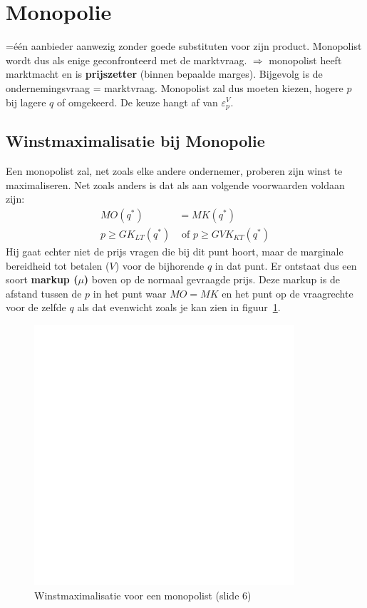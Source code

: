 \section{Monopolie}
=\'e\'en aanbieder aanwezig zonder goede substituten voor zijn product. Monopolist wordt dus als enige geconfronteerd met de marktvraag. $\Rightarrow$ monopolist heeft marktmacht en is \textbf{prijszetter} (binnen bepaalde marges). Bijgevolg is de ondernemingsvraag = marktvraag. Monopolist zal dus moeten kiezen, hogere $p$ bij lagere $q$ of omgekeerd. De keuze hangt af van $\varepsilon^V_p$.

\subsection{Winstmaximalisatie bij Monopolie}
Een monopolist zal, net zoals elke andere ondernemer, proberen zijn winst te maximaliseren. Net zoals anders is dat als aan volgende voorwaarden voldaan zijn:
\begin{align}
   MO(q^*) &= MK(q^*) \\
   p \ge GK_{LT}(q^*) &\text{ of } p \ge GVK_{KT}(q^*)
\end{align}
Hij gaat echter niet de prijs vragen die bij dit punt hoort, maar de marginale bereidheid tot betalen ($V$) voor de bijhorende $q$ in dat punt. Er ontstaat dus een soort \textbf{markup ($\mu$)} boven op de normaal gevraagde prijs. Deze markup is de afstand tussen de $p$ in het punt waar $MO = MK$ en het punt op de vraagrechte voor de zelfde $q$ als dat evenwicht zoals je kan zien in figuur~\ref{fig:globaleMarktEnAanbodEenProducent}.

\begin{figure}[htbp]
   \centering
   \includegraphics[scale=0.4]{Images/white.png}
   \caption{Winstmaximalisatie voor een monopolist (slide 6)}
   \label{fig:globaleMarktEnAanbodEenProducent}
\end{figure}

